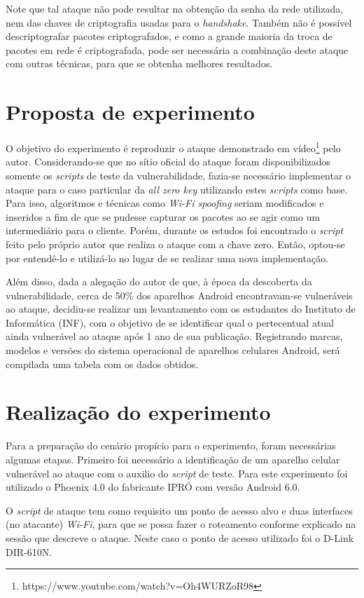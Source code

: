 \documentclass[12pt]{article}
\begin{document}
Note que tal ataque não pode resultar na obtenção da senha da rede utilizada, nem das chaves de criptografia usadas para o \textit{handshake}. Também não é possível descriptografar pacotes criptografados, e como a grande maioria da troca de pacotes em rede é criptografada, pode ser necessária a combinação deste ataque com outras técnicas, para que se obtenha melhores resultados.


\section{Proposta de experimento}
O objetivo do experimento é reproduzir o ataque demonstrado em vídeo\footnote{https://www.youtube.com/watch?v=Oh4WURZoR98} pelo autor. Considerando-se que no sítio oficial do ataque foram disponibilizados somente os \textit{scripts} de teste da vulnerabilidade, fazia-se necessário implementar o ataque para o caso particular da \textit{all zero key} utilizando estes \textit{scripts} como base. Para isso, algoritmos e técnicas como \textit{Wi-Fi spoofing} seriam modificados e inseridos a fim de que se pudesse capturar os pacotes ao se agir como um intermediário para o cliente. Porém, durante os estudos foi encontrado o \textit{script} feito pelo próprio autor que realiza o ataque com a chave zero. Então, optou-se por entendê-lo e utilizá-lo no lugar de se realizar uma nova implementação.  

Além disso, dada a alegação do autor de que, à época da descoberta da vulnerabilidade, cerca de 50\% dos aparelhos Android encontravam-se vulneráveis ao ataque, decidiu-se realizar um levantamento com os estudantes do Instituto de Informática (INF), com o objetivo de se identificar qual o pertecentual atual ainda vulnerável ao ataque após 1 ano de sua publicação. Registrando marcas, modelos e versões do sistema operacional de aparelhos celulares Android, será compilada uma tabela com os dados obtidos.

\section{Realização do experimento}
Para a preparação do cenário propício para o experimento, foram necessárias algumas etapas. Primeiro foi necessário a identificação de um aparelho celular vulnerável ao ataque com o auxilio do \textit{script} de teste. Para este experimento foi utilizado o Phoenix 4.0 do fabricante IPRÓ com versão Android 6.0.

O \textit{script} de ataque tem como requisito um ponto de acesso alvo e duas interfaces (no atacante) \textit{Wi-Fi}, para que se possa fazer o roteamento conforme explicado na sessão que descreve o ataque. Neste caso o ponto de acesso utilizado foi o D-Link DIR-610N.
\end{document}
